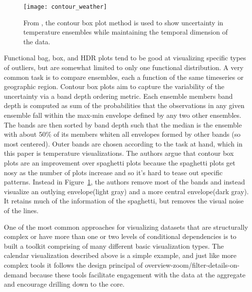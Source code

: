 \documentclass[../main.tex]{subfiles}
\begin{document}
\begin{figure}
  \texttt{[image: contour\_weather]}
  \caption{From \cite{whitaker_contour_2013}, the contour box plot method is used to show uncertainty in temperature ensembles while maintaining the temporal dimension of the data.}
  \label{fig:countour}
\end{figure}
Functional bag, box, and HDR plots \cite{rob_j._hyndman_rainbow_2010, sun_functional_2011} tend to be good at visualizing specific types of outliers, but are somewhat limited to only one functional distribution. A very common task is to compare ensembles, each a function of the same timeseries or geographic region. Contour box plots\cite{whitaker_contour_2013} aim to capture the variability of the
uncertainty via a band depth ordering metric. Each ensemble members band depth
is computed as sum of the probabilities that the observations in any given
ensemble fall within the max-min envelope defined by any two other
ensembles. The bands are then sorted by band depth such that the median is the
ensemble with about 50\% of its members whiten all envelopes formed by other
bands (so most centered). Outer bands are chosen according to the task at
hand, which in this paper is temperature visualizations. The authors argue that contour box plots are an improvement over spaghetti plots \cite{luo_visualizing_2003} because the spaghetti plots get nosy as the number of plots increase and so it's hard to tease out specific patterns. Instead in
Figure~\ref{fig:countour}, the authors remove most of the bands and instead visualize an outlying envelope(light gray) and a more central envelope(dark gray). It retains much of the information of
the spaghetti, but removes the visual noise of the lines.

One of the most common approaches for visualizing datasets that are structurally complex or have more than one or two levels of conditional dependencies is to built a toolkit comprising of many different basic visualization types. The calendar visualization described above is a simple example, and just like more complex tools it follows the design principal of overview-zoom/filter-details-on-demand \cite{shneiderman_eyes_1996} because these tools facilitate engagement with the data at the aggregate and encourage drilling down to the core. 
\end{document}
